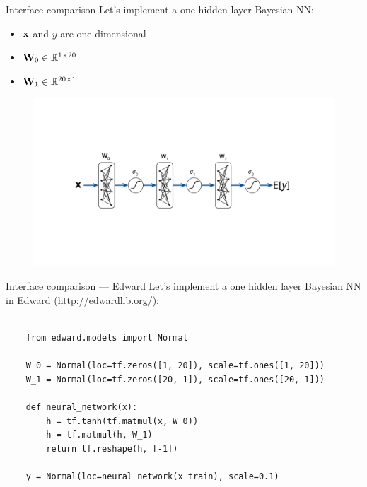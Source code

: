 \documentclass[lualatex, aspectratio=169]{beamer}
\begin{document}
\begin{frame}{Interface comparison}
  Let's implement a one hidden layer Bayesian NN:
  \begin{itemize}
    \item $\mathbf{x}$ and $y$ are one dimensional
    \item $\mathbf{W}_0 \in \mathbb{R}^{1 \times 20}$
    \item $\mathbf{W}_1 \in \mathbb{R}^{20 \times 1}$
  \end{itemize}
    \begin{figure}
      \includegraphics[page=5, trim={3cm 4.5cm 10cm 4.5cm}, clip, width=0.6\pagewidth]{assets/pictures.pdf}
    \end{figure}
\end{frame}


\begin{frame}[fragile]{Interface comparison --- Edward}
  Let's implement a one hidden layer Bayesian NN in Edward (\url{http://edwardlib.org/}):
  
  \begin{verbatim}

    from edward.models import Normal

    W_0 = Normal(loc=tf.zeros([1, 20]), scale=tf.ones([1, 20]))
    W_1 = Normal(loc=tf.zeros([20, 1]), scale=tf.ones([20, 1]))

    def neural_network(x):
        h = tf.tanh(tf.matmul(x, W_0))
        h = tf.matmul(h, W_1)
        return tf.reshape(h, [-1])

    y = Normal(loc=neural_network(x_train), scale=0.1)

  \end{verbatim}
\end{frame}
\end{document}
